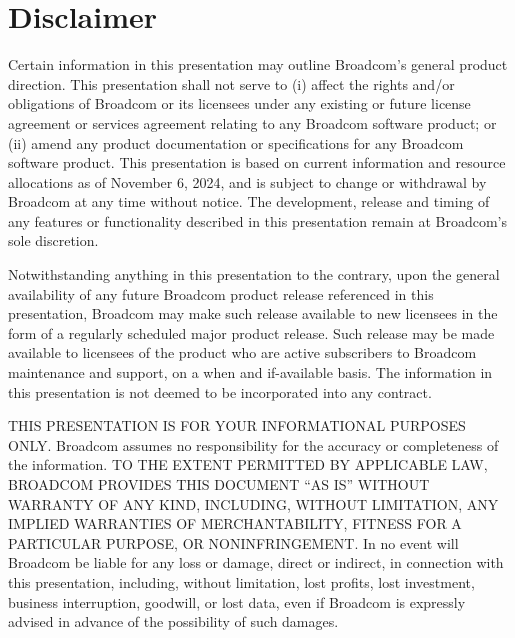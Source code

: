 \documentclass[a4paper]{article}
\begin{document}
\section{Disclaimer}
    Certain information in this presentation may outline Broadcom’s general product direction.  This presentation shall not serve to (i) affect the rights and/or obligations of Broadcom or its licensees under any existing or future license agreement or services agreement relating to any Broadcom software product; or (ii) amend any product documentation or specifications for any Broadcom software product. This presentation is based on current information and resource allocations as of November 6, 2024, and is subject to change or withdrawal by Broadcom at any time without notice.  The development, release and timing of any features or functionality described in this presentation remain at Broadcom’s sole discretion.
    
    Notwithstanding anything in this presentation to the contrary, upon the general availability of any future Broadcom product release referenced in this presentation, Broadcom may make such release available to new licensees in the form of a regularly scheduled major product release. Such release may be made available to licensees of the product who are active subscribers to Broadcom maintenance and support, on a when and if-available basis. The information in this presentation is not deemed to be incorporated into any contract.
    
    THIS PRESENTATION IS FOR YOUR INFORMATIONAL PURPOSES ONLY. Broadcom assumes no responsibility for the accuracy or completeness of the information. TO THE EXTENT PERMITTED BY APPLICABLE LAW, BROADCOM PROVIDES THIS DOCUMENT “AS IS” WITHOUT WARRANTY OF ANY KIND, INCLUDING, WITHOUT LIMITATION, ANY IMPLIED WARRANTIES OF MERCHANTABILITY, FITNESS FOR A PARTICULAR PURPOSE, OR NONINFRINGEMENT.  In no event will Broadcom be liable for any loss or damage, direct or indirect, in connection with this presentation, including, without limitation, lost profits, lost investment, business interruption, goodwill, or lost data, even if Broadcom is expressly advised in advance of the possibility of such damages.

\end{document}
